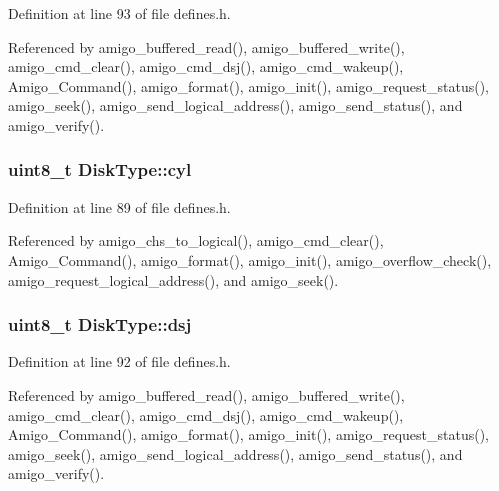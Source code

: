Definition at line 93 of file defines.\+h.



Referenced by amigo\+\_\+buffered\+\_\+read(), amigo\+\_\+buffered\+\_\+write(), amigo\+\_\+cmd\+\_\+clear(), amigo\+\_\+cmd\+\_\+dsj(), amigo\+\_\+cmd\+\_\+wakeup(), Amigo\+\_\+\+Command(), amigo\+\_\+format(), amigo\+\_\+init(), amigo\+\_\+request\+\_\+status(), amigo\+\_\+seek(), amigo\+\_\+send\+\_\+logical\+\_\+address(), amigo\+\_\+send\+\_\+status(), and amigo\+\_\+verify().

\subsubsection[{\texorpdfstring{cyl}{cyl}}]{\setlength{\rightskip}{0pt plus 5cm}uint8\+\_\+t Disk\+Type\+::cyl}\hypertarget{structDiskType_a990d2a05bc2d8bf1328d0249202539e5}{}\label{structDiskType_a990d2a05bc2d8bf1328d0249202539e5}


Definition at line 89 of file defines.\+h.



Referenced by amigo\+\_\+chs\+\_\+to\+\_\+logical(), amigo\+\_\+cmd\+\_\+clear(), Amigo\+\_\+\+Command(), amigo\+\_\+format(), amigo\+\_\+init(), amigo\+\_\+overflow\+\_\+check(), amigo\+\_\+request\+\_\+logical\+\_\+address(), and amigo\+\_\+seek().

\subsubsection[{\texorpdfstring{dsj}{dsj}}]{\setlength{\rightskip}{0pt plus 5cm}uint8\+\_\+t Disk\+Type\+::dsj}\hypertarget{structDiskType_ad89ac2f4b87d861ae4ca3f185868b7da}{}\label{structDiskType_ad89ac2f4b87d861ae4ca3f185868b7da}


Definition at line 92 of file defines.\+h.



Referenced by amigo\+\_\+buffered\+\_\+read(), amigo\+\_\+buffered\+\_\+write(), amigo\+\_\+cmd\+\_\+clear(), amigo\+\_\+cmd\+\_\+dsj(), amigo\+\_\+cmd\+\_\+wakeup(), Amigo\+\_\+\+Command(), amigo\+\_\+format(), amigo\+\_\+init(), amigo\+\_\+request\+\_\+status(), amigo\+\_\+seek(), amigo\+\_\+send\+\_\+logical\+\_\+address(), amigo\+\_\+send\+\_\+status(), and amigo\+\_\+verify().

